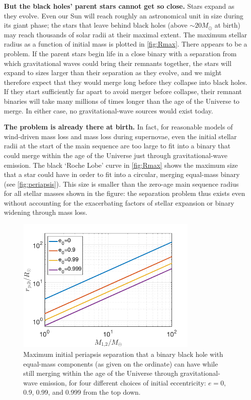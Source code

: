 \documentclass[review]{elsarticle}
\begin{document}
\textbf{But the black holes' parent stars cannot get so close.} Stars expand as they evolve. Even our Sun will reach roughly an astronomical unit in size during its giant phase; the stars that leave behind black holes (above $\sim 20 M_\odot$  at birth) may reach thousands of solar radii at their maximal extent. The maximum stellar radius as a function of initial mass is plotted in \autoref{fig:Rmax}. There appears to be a problem. If the parent stars begin life in a close binary with a separation from which gravitational waves could bring their remnants together, the stars will expand to sizes larger than their separation as they evolve, and we might therefore expect that they would merge long before they collapse into black holes. If they start sufficiently far apart to avoid merger before collapse, their remnant binaries will take many millions of times longer than the age of the Universe to merge. In either case, no gravitational-wave sources would exist today. 

\textbf{The problem is already there at birth.} In fact, for reasonable models of wind-driven mass loss and mass loss during supernovae, even the initial stellar radii at the start of the main sequence are too large to fit into a binary that could merge within the age of the Universe just through gravitational-wave emission.  The black `Roche Lobe' curve in \autoref{fig:Rmax} shows the maximum size that a star could have in order to fit into a circular, merging equal-mass binary (see \autoref{fig:periapsis}).  This size is smaller than the zero-age main sequence radius for all stellar masses shown in the figure: the separation problem thus exists even without accounting for the exacerbating factors of stellar expansion or binary widening through mass loss.


\begin{figure}
	\centering
	\includegraphics[width=0.8\textwidth]{M-rp-log.png}
	\caption{Maximum initial periapsis separation that a binary black hole with equal-mass components (as given on the ordinate) can have while still merging within the age of the Universe through gravitational-wave emission, for four different choices of initial eccentricity: $e=0$, 0.9, 0.99, and 0.999 from the top down.\label{fig:periapsis}}
\end{figure}
	
\end{document}
